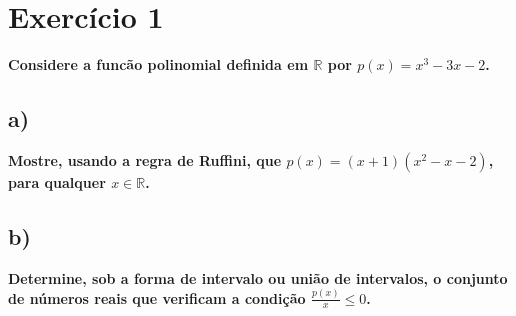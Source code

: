 \documentclass[a4paper]{article}
\begin{document}
\section*{Exercício 1} \textbf{Considere a funcão polinomial definida em $\mathbb{R}$ por $p(x)=x^3-3x-2$.}
\subsection*{a)}
\textbf{Mostre, usando a regra de Ruffini, que $p(x)=(x+1)(x^2-x-2)$, para qualquer $ x \in \mathbb{R}$.}




\subsection*{b)}\textbf{Determine, sob a forma de intervalo ou união de intervalos, o conjunto de números reais que verificam a condição $\frac{p(x)}{x} \leq 0$.}\\

\end{document}
